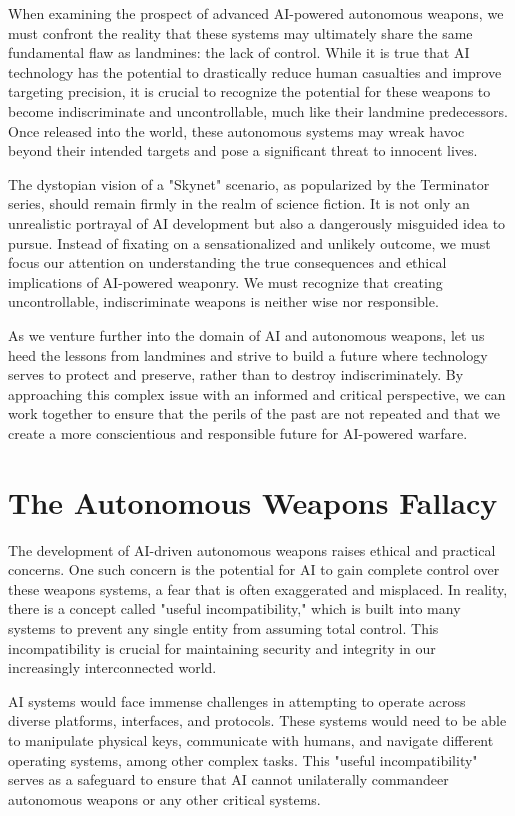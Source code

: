 When examining the prospect of advanced AI-powered autonomous weapons, we must confront the reality that these systems may ultimately share the same fundamental flaw as landmines: the lack of control. While it is true that AI technology has the potential to drastically reduce human casualties and improve targeting precision, it is crucial to recognize the potential for these weapons to become indiscriminate and uncontrollable, much like their landmine predecessors. Once released into the world, these autonomous systems may wreak havoc beyond their intended targets and pose a significant threat to innocent lives.

The dystopian vision of a "Skynet" scenario, as popularized by the Terminator series, should remain firmly in the realm of science fiction. It is not only an unrealistic portrayal of AI development but also a dangerously misguided idea to pursue. Instead of fixating on a sensationalized and unlikely outcome, we must focus our attention on understanding the true consequences and ethical implications of AI-powered weaponry. We must recognize that creating uncontrollable, indiscriminate weapons is neither wise nor responsible.

As we venture further into the domain of AI and autonomous weapons, let us heed the lessons from landmines and strive to build a future where technology serves to protect and preserve, rather than to destroy indiscriminately. By approaching this complex issue with an informed and critical perspective, we can work together to ensure that the perils of the past are not repeated and that we create a more conscientious and responsible future for AI-powered warfare.

\section{The Autonomous Weapons Fallacy}

The development of AI-driven autonomous weapons raises ethical and practical concerns. One such concern is the potential for AI to gain complete control over these weapons systems, a fear that is often exaggerated and misplaced. In reality, there is a concept called "useful incompatibility," which is built into many systems to prevent any single entity from assuming total control. This incompatibility is crucial for maintaining security and integrity in our increasingly interconnected world.

AI systems would face immense challenges in attempting to operate across diverse platforms, interfaces, and protocols. These systems would need to be able to manipulate physical keys, communicate with humans, and navigate different operating systems, among other complex tasks. This "useful incompatibility" serves as a safeguard to ensure that AI cannot unilaterally commandeer autonomous weapons or any other critical systems.

